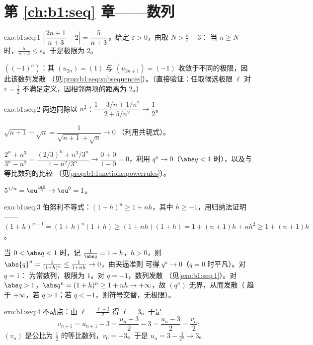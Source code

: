 \section*{第 \ref{ch:b1:seq} 章——数列}

\begin{solution}{exo:b1:seq:1}
$\Bigl|\dfrac{2n+1}{n+3} - 2\Bigr| = \dfrac{5}{n+3}$。给定
$\varepsilon > 0$，由取 $N > \frac 5\varepsilon - 3$：
当 $n \geq N$ 时，$\frac{5}{n+3} \leq \varepsilon$。于是极限为
$2$。

$((-1)^n)$：其 $(u_{2n}) = (1)$ 与 $(u_{2n+1}) =
(-1)$ 收敛于不同的极限，因此该数列发散
（见\cref{prop:b1:seq:subsequences}）。（直接验证：任取候选极限 $\ell$
对 $\varepsilon = \frac12$ 不满足定义，因相邻两项的距离为
$2$。）
\end{solution}

\begin{solution}{exo:b1:seq:2}
两边同除以 $n^2$：$\dfrac{1 - 3/n + 1/n^2}{2 + 5/n^2} \to
\dfrac12$。

$\sqrt{n+1} - \sqrt n = \dfrac{1}{\sqrt{n+1} + \sqrt n} \to 0$
（利用共轭式）。

$\dfrac{2^n + n^3}{3^n - n^2} = \dfrac{(2/3)^n + n^3/3^n}{1 -
n^2/3^n} \to \dfrac{0 + 0}{1 - 0} = 0$，利用 $q^n \to 0$（$\abs q
< 1$ 时），以及与等比数列的比较
（见\cref{prop:b1:functions:powerrules}）。

$5^{1/n} = \eu^{\frac{\ln 5}{n}} \to \eu^0 = 1$。
\end{solution}

\begin{solution}{exo:b1:seq:3}
伯努利不等式：$(1+h)^n \geq 1 + nh$，其中 $h \geq -1$，用归纳法证明——
$(1+h)^{n+1} = (1+h)^n(1+h) \geq (1+nh)(1+h) = 1 + (n+1)h + nh^2
\geq 1 + (n+1)h$。

当 $0 < \abs q < 1$ 时，记 $\frac{1}{\abs q} = 1 + h$，$h > 0$，则
$\abs{q}^n = \frac{1}{(1+h)^n} \leq \frac{1}{1 + nh} \to 0$，由夹逼准则
可得 $q^n \to 0$（$q = 0$ 时平凡）。对 $q = 1$：
为常数列，极限为 $1$。对 $q = -1$，数列发散
（见\cref{exo:b1:seq:1}）。对 $\abs q > 1$，$\abs q^n = (1 + h)^n \geq
1 + nh \to +\infty$，故 $(q^n)$ 无界，从而发散（
趋于 $+\infty$，若 $q > 1$；若 $q <
-1$，则符号交替，无极限）。
\end{solution}

\begin{solution}{exo:b1:seq:4}
不动点：由 $\ell = \frac{\ell + 3}{2}$ 得 $\ell = 3$。于是
\[
v_{n+1} = u_{n+1} - 3 = \frac{u_n + 3}{2} - 3 = \frac{u_n - 3}{2} =
\frac{v_n}{2}:
\]
$(v_n)$ 是公比为 $\frac12$ 的等比数列，$v_0 = -3$。于是 $u_n = 3 -
\frac{3}{2^n} \to 3$。
\end{solution}

